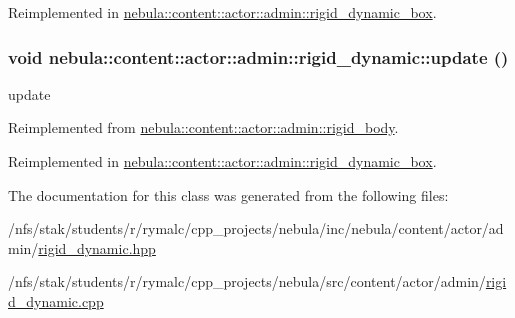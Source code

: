 Reimplemented in \hyperlink{classnebula_1_1content_1_1actor_1_1admin_1_1rigid__dynamic__box_a2989dba143de5dabded9ca32702cccaa}{nebula::content::actor::admin::rigid\_\-dynamic\_\-box}.\hypertarget{classnebula_1_1content_1_1actor_1_1admin_1_1rigid__dynamic_a2bf9e18773b7db87cb35fef56274405a}{
\subsubsection[{update}]{\setlength{\rightskip}{0pt plus 5cm}void nebula::content::actor::admin::rigid\_\-dynamic::update ()}}
\label{classnebula_1_1content_1_1actor_1_1admin_1_1rigid__dynamic_a2bf9e18773b7db87cb35fef56274405a}


update 

Reimplemented from \hyperlink{classnebula_1_1content_1_1actor_1_1admin_1_1rigid__body_aacabe8d617dd48c2ffec43edae75553d}{nebula::content::actor::admin::rigid\_\-body}.

Reimplemented in \hyperlink{classnebula_1_1content_1_1actor_1_1admin_1_1rigid__dynamic__box_ad0c1ca664351042f80ede5ed0a5bba0a}{nebula::content::actor::admin::rigid\_\-dynamic\_\-box}.

The documentation for this class was generated from the following files:\begin{DoxyCompactItemize}
\item 
/nfs/stak/students/r/rymalc/cpp\_\-projects/nebula/inc/nebula/content/actor/admin/\hyperlink{admin_2rigid__dynamic_8hpp}{rigid\_\-dynamic.hpp}\item 
/nfs/stak/students/r/rymalc/cpp\_\-projects/nebula/src/content/actor/admin/\hyperlink{admin_2rigid__dynamic_8cpp}{rigid\_\-dynamic.cpp}\end{DoxyCompactItemize}
